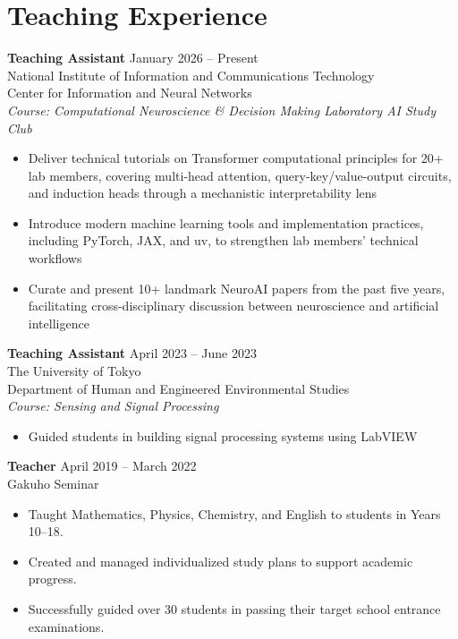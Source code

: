 \documentclass[letterpaper,10.5pt]{article}
\begin{document}
\section*{Teaching Experience}
\textbf{Teaching Assistant} \hfill January 2026 -- Present \\
National Institute of Information and Communications Technology \\ 
Center for Information and Neural Networks \\ 
\textit{Course: Computational Neuroscience \& Decision Making Laboratory AI Study Club} \\
\vspace{-7pt}
\begin{itemize}[itemsep=0pt, parsep=0pt, topsep=0pt]
  \item Deliver technical tutorials on Transformer computational principles for 20+ lab members, covering multi-head attention, query-key/value-output circuits, and induction heads through a mechanistic interpretability lens
  \item Introduce modern machine learning tools and implementation practices, including PyTorch, JAX, and uv, to strengthen lab members’ technical workflows
  \item Curate and present 10+ landmark NeuroAI papers from the past five years, facilitating cross-disciplinary discussion between neuroscience and artificial intelligence
\end{itemize}\vspace{25pt}
\textbf{Teaching Assistant} \hfill April 2023 -- June 2023 \\
The University of Tokyo \\ 
Department of Human and Engineered Environmental Studies \\ 
\textit{Course: Sensing and Signal Processing} \\
\vspace{-7pt}
\begin{itemize}[itemsep=0pt, parsep=0pt, topsep=0pt]
  \item Guided students in building signal processing systems using LabVIEW
\end{itemize}\vspace{25pt}
\textbf{Teacher} \hfill April 2019 -- March 2022 \\
Gakuho Seminar \\ 
\vspace{-7pt}
\begin{itemize}[itemsep=0pt, parsep=0pt, topsep=0pt]
  \item Taught Mathematics, Physics, Chemistry, and English to students in Years 10–18.
  \item Created and managed individualized study plans to support academic progress.
  \item Successfully guided over 30 students in passing their target school entrance examinations.
\end{itemize}\vspace{25pt}
\end{document}
